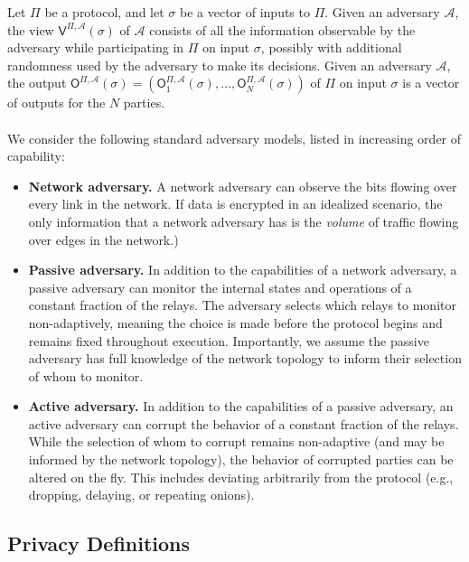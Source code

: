Let $\Pi$ be a protocol, and let $\sigma$ be a vector of inputs to $\Pi$. Given an adversary $\mathcal{A}$, the view $\mathsf{V}^{\Pi,\mathcal{A}}(\sigma)$ of $\mathcal{A}$ consists of all the information observable by the adversary while participating in $\Pi$ on input $\sigma$, possibly with additional randomness used by the adversary to make its decisions. Given an adversary $\mathcal{A}$, the output $\mathsf{O}^{\Pi,\mathcal{A}}(\sigma) = (\mathsf{O}^{\Pi,\mathcal{A}}_1(\sigma), \dots, \mathsf{O}^{\Pi,\mathcal{A}}_N(\sigma))$ of $\Pi$ on input $\sigma$ is a vector of outputs for the $N$ parties.\\\\
We consider the following standard adversary models, listed in increasing order of capability:\\
\begin{itemize}
    \item \textbf{Network adversary.} A network adversary can observe the bits flowing over every link in the network. If data is encrypted in an idealized scenario, the only information that a network adversary has is the \textit{volume} of traffic flowing over edges in the network.)\\
    
    \item \textbf{Passive adversary.} In addition to the capabilities of a network adversary, a passive adversary can monitor the internal states and operations of a constant fraction of the relays. The adversary selects which relays to monitor non-adaptively, meaning the choice is made before the protocol begins and remains fixed throughout execution. Importantly, we assume the passive adversary has full knowledge of the network topology to inform their selection of whom to monitor.\\
    
    \item \textbf{Active adversary.} In addition to the capabilities of a passive adversary, an active adversary can corrupt the behavior of a constant fraction of the relays. While the selection of whom to corrupt remains non-adaptive (and may be informed by the network topology), the behavior of corrupted parties can be altered on the fly. This includes deviating arbitrarily from the protocol (e.g., dropping, delaying, or repeating onions). \\
\end{itemize}

\subsection{Privacy Definitions}

